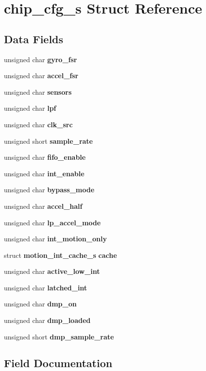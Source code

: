\section{chip\+\_\+cfg\+\_\+s Struct Reference}
\label{structchip__cfg__s}
\subsection*{Data Fields}
\begin{DoxyCompactItemize}
\item 
unsigned char \textbf{ gyro\+\_\+fsr}
\item 
unsigned char \textbf{ accel\+\_\+fsr}
\item 
unsigned char \textbf{ sensors}
\item 
unsigned char \textbf{ lpf}
\item 
unsigned char \textbf{ clk\+\_\+src}
\item 
unsigned short \textbf{ sample\+\_\+rate}
\item 
unsigned char \textbf{ fifo\+\_\+enable}
\item 
unsigned char \textbf{ int\+\_\+enable}
\item 
unsigned char \textbf{ bypass\+\_\+mode}
\item 
unsigned char \textbf{ accel\+\_\+half}
\item 
unsigned char \textbf{ lp\+\_\+accel\+\_\+mode}
\item 
unsigned char \textbf{ int\+\_\+motion\+\_\+only}
\item 
struct \textbf{ motion\+\_\+int\+\_\+cache\+\_\+s} \textbf{ cache}
\item 
unsigned char \textbf{ active\+\_\+low\+\_\+int}
\item 
unsigned char \textbf{ latched\+\_\+int}
\item 
unsigned char \textbf{ dmp\+\_\+on}
\item 
unsigned char \textbf{ dmp\+\_\+loaded}
\item 
unsigned short \textbf{ dmp\+\_\+sample\+\_\+rate}
\end{DoxyCompactItemize}


\subsection{Field Documentation}
\mbox{\label{structchip__cfg__s_a97d5de8aa2fab5cc81ca2180130fc6ac}} 
